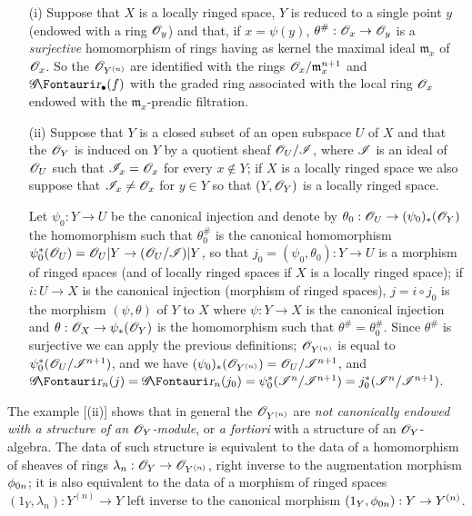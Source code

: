 \begin{examples}[16.1.3]
\label{IV.16.1.3}
\medskip\noindent
\begin{enumerate}
  \item[(i)] Suppose that $X$ is a locally ringed space, $Y$ is reduced to a single point $y$ (endowed with a ring $\mathscr{O}_y$) and that, if $x = \psi(y)$, $\theta^\#:\sh{O}_x \to \sh{O}_y$ is a \emph{surjective} homomorphism of rings having as kernel the maximal ideal $\mathfrak{m}_x$ of $\mathscr{O}_x$.
  So the $\mathscr{O}_{Y^{(n)}}$ are identified with the rings $\mathscr{O}_x/\mathfrak{m}_x^{n+1}$ and $\shGr_\bullet(f)$ with the graded ring associated with the local ring $\mathscr{O}_x$ endowed with the $\mathfrak{m}_x$-preadic filtration.
  \item[(ii)] Suppose that $Y$ is a closed subset of an open subspace $U$ of $X$ and that the $\mathscr{O}_Y$ is induced on $Y$ by a quotient sheaf $\mathscr{O}_U/\mathscr{I}$, where $\mathscr{I}$ is an ideal of $\mathscr{O}_U$ such that $\mathscr{I}_x = \mathscr{O}_x$ for every $x \not\in Y$;
  if $X$ is a locally ringed space we also suppose that $\mathscr{I}_x \neq \mathscr{O}_x$ for $y \in Y$ so that $(Y, \mathscr{O}_Y)$ is a locally ringed space.
  
  Let $\psi_0: Y \to U$ be the canonical injection and denote by $\theta_0: \sh{O}_U \to (\psi_0)_*(\sh{O}_Y)$ the homomorphism such that $\theta_0^\#$ is the canonical homomorphism $\psi^*_0(\sh{O}_U) = \sh{O}_U|Y \to (\sh{O}_U/\sh{I})|Y$, so that $j_0=(\psi_0, \theta_0):Y \to U$ is a morphism of ringed spaces (and of locally ringed spaces if $X$ is a locally ringed space);
  if $i:U \to X$ is the canonical injection (morphism of ringed spaces), $j = i\circ j_0$ is the morphism $(\psi, \theta)$ of $Y$ to $X$ where $\psi: Y \to X$ is the canonical injection and $\theta:\sh{O}_X \to \psi_*(\sh{O}_Y)$ is the homomorphism such that $\theta^\# = \theta_0^\#$.
  Since $\theta^\#$ is surjective we can apply the previous definitions;
  $\mathscr{O}_{Y^{(n)}}$ is equal to $\psi^*_0(\mathscr{O}_U/\mathscr{I}^{n+1})$, and we have $(\psi_0)_*(\mathscr{O}_{Y^{(n)}} ) = \mathscr{O}_U/\mathscr{I}^{n+1}$, and $\shGr_n(j) = \shGr_n(j_0) = \psi^*_0(\sh{I}^n/\sh{I}^{n+1}) = j^*_0(\sh{I}^n/\sh{I}^{n+1})$.
\end{enumerate}
\end{examples}

\begin{env}[16.1.4]
\label{IV.16.1.4}
The example [(ii)] shows that in general the $\mathscr{O}_{Y^{(n)}}$ are \emph{not canonically endowed with a structure of an $\mathscr{O}_Y$-module}, or \emph{a fortiori} with a structure of an $\mathscr{O}_Y$-algebra.
The data of such structure is equivalent to the data of a homomorphism of sheaves of rings $\lambda_n:\sh{O}_Y \to \sh{O}_{Y^{(n)}}$, right inverse to the augmentation morphism $\phi_{0n}$;
it is also equivalent to the data of a morphism of ringed spaces $(1_Y, \lambda_n): Y^{(n)} \to Y$ left inverse to the canonical morphism $(1_Y, \vphi_{0n}): Y \to Y^{(n)}$.
\end{env}

